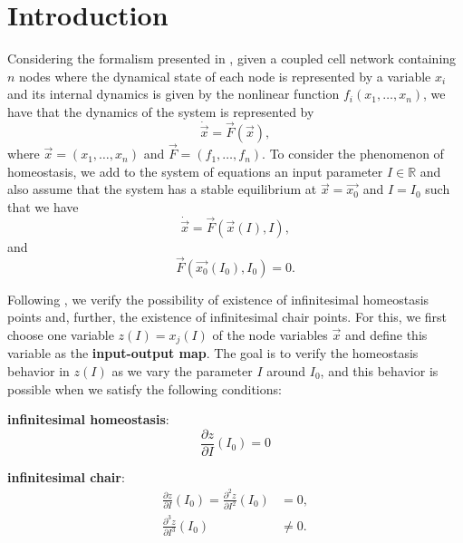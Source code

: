 \section{Introduction}
\label{sec:intro}

Considering the formalism presented in \cite{martin_ian_groupoids2006,wang2021}, 
given a coupled cell network containing $n$ nodes where the dynamical state of each node 
is represented by a variable $x_i$ and its internal dynamics is given by the
nonlinear function $f_i(x_1, \dots, x_n)$, we have that the dynamics of the 
system is represented by 
\begin{equation} \label{eq:system}
    \dot{\vec{x}} = \vec{F}(\vec{x}),
\end{equation}
where $\vec{x} = (x_1, \dots, x_n)$ and $\vec{F} = (f_1, \dots, f_n)$. To consider
the phenomenon of homeostasis, we add to the system of equations an input parameter
$I \in \mathbb{R}$ and also assume that the system has a stable equilibrium at 
$\vec{x} = \vec{x_0}$ and $I = I_0$ such that we have 
\begin{equation} \label{eq:system-input}
    \dot{\vec{x}} = \vec{F}(\vec{x}(I), I),
\end{equation}
and
\begin{equation}
    \vec{F}(\vec{x_0}(I_0), I_0) = 0.
\end{equation}

Following \cite{wang2021,homeostasis_antonelli2018}, we verify the possibility of existence of infinitesimal
homeostasis points and, further, the existence of infinitesimal chair points. For this, we
first choose one variable $z(I) = x_j(I)$ of the node variables $\vec{x}$ and define this 
variable as the \textbf{input-output map}\cite{homeostasis_antonelli2018}. The goal is to 
verify the homeostasis behavior in $z(I)$ as we vary the parameter $I$ around $I_0$, and 
this behavior is possible when we satisfy the following conditions:

\textbf{infinitesimal homeostasis}:
\begin{equation} \label{eq:infinitesimal-condition}
    \frac{\partial z}{\partial I}(I_0) = 0
\end{equation}

\textbf{infinitesimal chair}:
\begin{equation} \label{eq:chair-condition}
    \begin{aligned}
    \frac{\partial z}{\partial I}(I_0) = \frac{\partial^2 z}{\partial I^2}(I_0)& = 0, \\
    \frac{\partial^3 z}{\partial I^3}(I_0) &\neq 0.
    \end{aligned}
\end{equation}

